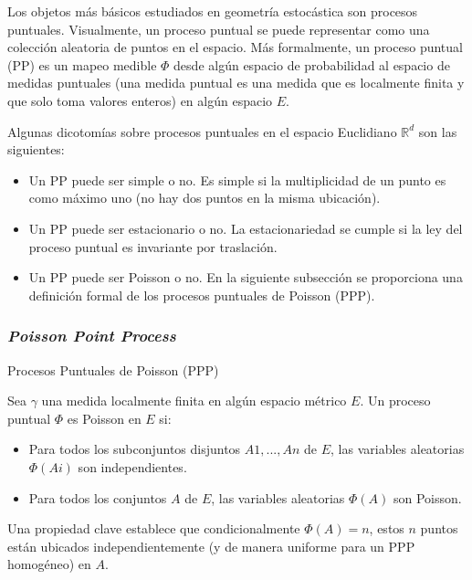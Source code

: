 Los objetos más básicos estudiados en geometría estocástica son procesos puntuales. Visualmente, un proceso puntual se puede representar como una colección aleatoria de puntos en el espacio. Más formalmente, un proceso puntual (PP) es un mapeo medible $\Phi$ desde algún espacio de probabilidad al espacio de medidas puntuales (una medida puntual es una medida que es localmente finita y que solo toma valores enteros) en algún espacio $E$.\newline

Algunas dicotomías sobre procesos puntuales en el espacio Euclidiano $\mathbb{R}^{d}$ son las siguientes:\newline

\begin{itemize}
    \item Un PP puede ser simple o no. Es simple si la multiplicidad de un punto es como máximo uno (no hay dos puntos en la misma ubicación).
    \item Un PP puede ser estacionario o no. La estacionariedad se cumple si la ley del proceso puntual es invariante por traslación.
    \item Un PP puede ser Poisson o no. En la siguiente subsección se proporciona una definición formal de los procesos puntuales de Poisson (PPP).
\end{itemize}

\subsubsection{\textit{Poisson Point Process}}
Procesos Puntuales de Poisson (PPP) \parencite{Haenggi2009}\newline

Sea $\gamma$ una medida localmente finita en algún espacio métrico $E$. Un proceso puntual $\Phi $ es Poisson en $E$ si:

\begin{itemize}
    \item Para todos los subconjuntos disjuntos $A1, ..., An$ de $E$, las variables aleatorias $\Phi(Ai)$ son independientes.
    \item Para todos los conjuntos $A$ de $E$, las variables aleatorias $\Phi(A)$ son Poisson.
\end{itemize}

Una propiedad clave establece que condicionalmente $\Phi(A)= n$, estos $n$ puntos están ubicados independientemente (y de manera uniforme para un PPP homogéneo) en $A$.\newline

